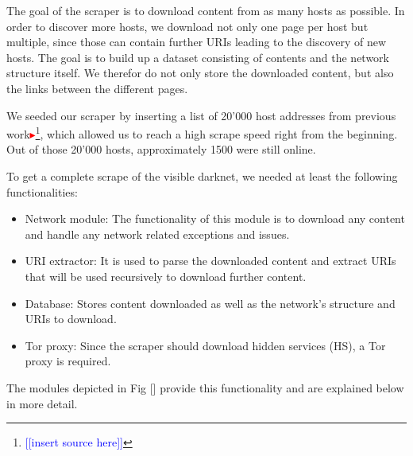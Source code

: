 \documentclass[USenglish,oneside,twocolumn]{article}
\newcommand{\nb}[1]{\textcolor{red}{$\blacktriangleright$}\footnote{\textcolor{blue}{[[#1]]}}}
\begin{document}
The goal of the scraper is to download content from as many hosts as possible. In order to discover more hosts, we download not only one page per host but multiple, since those can contain further URIs leading to the discovery of new hosts. The goal is to build up a dataset consisting of contents and the network structure itself. We therefor do not only store the downloaded content, but also the links between the different pages.

We seeded our scraper by inserting a list of 20'000 host addresses from previous work\nb{insert source here}, which allowed us to reach a high scrape speed right from the beginning. Out of those 20'000 hosts, approximately 1500 were still online. 

To get a complete scrape of the visible darknet, we needed at least the following functionalities:
\begin{itemize}
    \item Network module: The functionality of this module is to download any content and handle any network related exceptions and issues.
    \item URI extractor: It is used to parse the downloaded content and extract URIs that will be used recursively to download further content.
    \item Database: Stores content downloaded as well as the network's structure and URIs to download.
    \item Tor proxy: Since the scraper should download hidden services (HS), a Tor proxy is required.
\end{itemize}

The modules depicted in Fig [] provide this functionality and are explained below in more detail.
\end{document}
